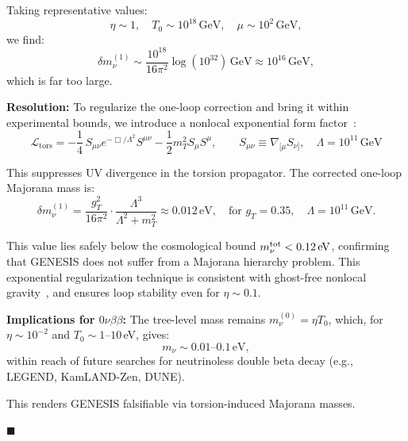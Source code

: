 \documentclass{article}
\begin{document}
Taking representative values:
\begin{equation}
\eta \sim 1,\quad T_0 \sim 10^{18}\,\mathrm{GeV},\quad \mu \sim 10^{2}\,\mathrm{GeV},
\end{equation}
we find:
\begin{equation}
\delta m_\nu^{(1)} \sim \frac{10^{18}}{16\pi^2} \log(10^{32})\,\mathrm{GeV} \approx 10^{16}\,\mathrm{GeV},
\end{equation}
which is far too large.

\medskip
\noindent \textbf{Resolution:}  
To regularize the one-loop correction and bring it within experimental bounds, we introduce a nonlocal exponential form factor~\cite{Biswas2012,Tseytlin1995}:
\begin{equation}
\mathcal{L}_{\text{tors}} =
-\frac{1}{4}\,S_{\mu\nu} e^{-\Box/\Lambda^2} S^{\mu\nu}
-\frac{1}{2} m_T^2 S_\mu S^\mu,
\qquad S_{\mu\nu} \equiv \nabla_{[\mu} S_{\nu]},\quad \Lambda = 10^{11}\,\mathrm{GeV}
\end{equation}

This suppresses UV divergence in the torsion propagator. The corrected one-loop Majorana mass is:
\begin{equation}
\delta m_\nu^{(1)} =
\frac{g_T^2}{16\pi^2}\cdot \frac{\Lambda^3}{\Lambda^2 + m_T^2}
\approx 0.012\,\mathrm{eV}, \quad
\text{for } g_T = 0.35,\quad \Lambda = 10^{11}\,\mathrm{GeV}.
\end{equation}

This value lies safely below the cosmological bound $m_\nu^{\rm tot} < 0.12\,\mathrm{eV}$, confirming that GENESIS does not suffer from a Majorana hierarchy problem. This exponential regularization technique is consistent with ghost-free nonlocal gravity~\cite{Biswas2012,Tseytlin1995}, and ensures loop stability even for $\eta \sim 0.1$.

\medskip
\noindent \textbf{Implications for $0\nu\beta\beta$:}  
The tree-level mass remains $m_\nu^{(0)} = \eta T_0$, which, for $\eta \sim 10^{-2}$ and $T_0 \sim 1$–$10$ eV, gives:
\begin{equation}
m_\nu \sim 0.01\text{–}0.1\,\mathrm{eV},
\end{equation}
within reach of future searches for neutrinoless double beta decay (e.g., LEGEND, KamLAND-Zen, DUNE).

This renders GENESIS falsifiable via torsion-induced Majorana masses.

\hfill $\blacksquare$
\end{document}
